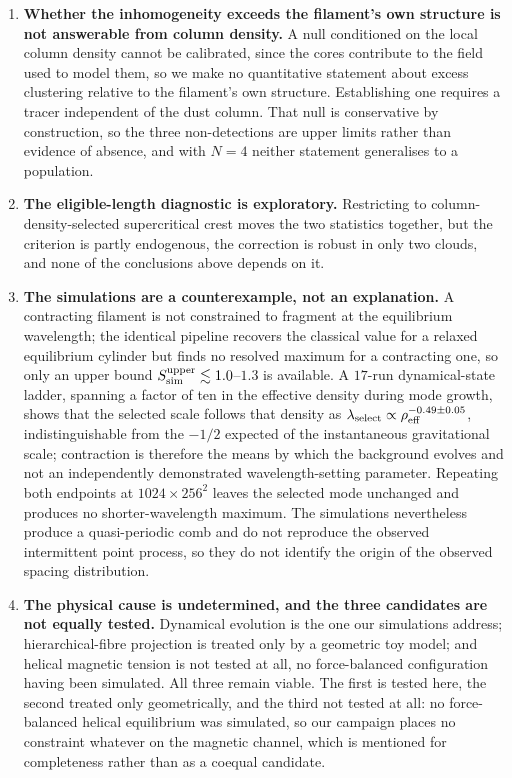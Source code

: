 \documentclass[usenatbib,twoside,twocolumn]{mnras}
\begin{document}
\begin{enumerate}
\item \textbf{Whether the inhomogeneity exceeds the filament's own structure is not answerable from column density.} A null conditioned on the local column density cannot be calibrated, since the cores contribute to the field used to model them, so we make no quantitative statement about excess clustering relative to the filament's own structure. Establishing one requires a tracer independent of the dust column. That null is conservative by construction, so the three non-detections are upper limits rather than evidence of absence, and with $N=4$ neither statement generalises to a population.
\item \textbf{The eligible-length diagnostic is exploratory.} Restricting to column-density-selected supercritical crest moves the two statistics together, but the criterion is partly endogenous, the correction is robust in only two clouds, and none of the conclusions above depends on it.
\item \textbf{The simulations are a counterexample, not an explanation.} A contracting filament is not constrained to fragment at the equilibrium wavelength; the identical pipeline recovers the classical value for a relaxed equilibrium cylinder but finds no resolved maximum for a contracting one, so only an upper bound $S_{\rm sim}^{\rm upper}\lesssim1.0$--$1.3$ is available. A $17$-run dynamical-state ladder, spanning a factor of ten in the effective density during mode growth, shows that the selected scale follows that density as $\lambda_{\rm select}\propto\rho_{\rm eff}^{-0.49\pm0.05}$, indistinguishable from the $-1/2$ expected of the instantaneous gravitational scale; contraction is therefore the means by which the background evolves  and not an independently demonstrated wavelength-setting parameter. Repeating both endpoints at $1024\times256^2$ leaves the selected mode unchanged and produces no shorter-wavelength maximum. The simulations nevertheless produce a quasi-periodic comb and do not reproduce the observed intermittent point process, so they do not identify the origin of the observed spacing distribution.
\item \textbf{The physical cause is undetermined, and the three candidates are not equally tested.} Dynamical evolution is the one our simulations address; hierarchical-fibre projection is treated only by a geometric toy model; and helical magnetic tension is not tested at all, no force-balanced configuration having been simulated. All three remain viable. The first is tested here, the second treated only geometrically, and the third not tested at all: no force-balanced helical equilibrium was simulated, so our campaign places no constraint whatever on the magnetic channel, which is mentioned for completeness rather than as a coequal candidate.
\end{enumerate}
\end{document}
